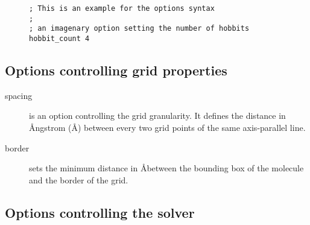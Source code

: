\documentclass[12pt,twoside,a4paper]{article}
\begin{document}
\begin{figure}[H]
\begin{verbatim}
; This is an example for the options syntax
;
; an imagenary option setting the number of hobbits
hobbit_count 4
\end{verbatim}
\end{figure}

\subsection{Options controlling grid properties}

\begin{description}
\item[spacing] is an option controlling the grid granularity. It defines
	the distance in \AA ngstrom (\AA) between every two grid points of the same
	axis-parallel line.
\item[border] sets the minimum distance in \AA between the bounding
	box of the molecule and the border of the grid. 
\end{description}

\subsection{Options controlling the solver}
\end{document}
